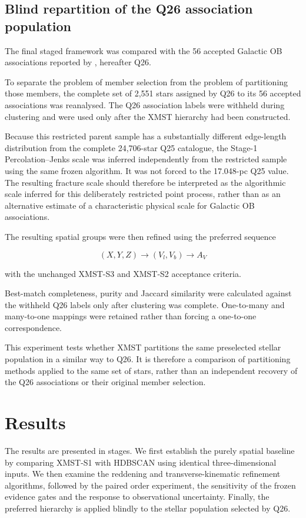 \documentclass[fleqn,usenatbib]{rasti}
\begin{document}
\subsection{Blind repartition of the Q26 association population}
\label{sec:q26_method}

The final staged framework was compared with the 56 accepted Galactic OB
associations reported by \citet{Quintana2026}, hereafter Q26.

To separate the problem of member selection from the problem of partitioning
those members, the complete set of 2,551 stars assigned by Q26 to its
56 accepted associations was reanalysed. The Q26 association labels were
withheld during clustering and were used only after the XMST hierarchy had
been constructed.

Because this restricted parent sample has a substantially different
edge-length distribution from the complete 24,706-star Q25 catalogue, the
Stage-1 Percolation--Jenks scale was inferred independently from the
restricted sample using the same frozen algorithm. It was not forced to the
17.048-pc Q25 value. The resulting fracture scale should therefore be interpreted as the
algorithmic scale inferred for this deliberately restricted point process,
rather than as an alternative estimate of a characteristic physical scale
for Galactic OB associations.

The resulting spatial groups were then refined using the preferred sequence

\[
(X,Y,Z)\rightarrow(V_l,V_b)\rightarrow A_V
\]

with the unchanged XMST-S3 and XMST-S2 acceptance criteria.

Best-match completeness, purity and Jaccard similarity were calculated
against the withheld Q26 labels only after clustering was complete.
One-to-many and many-to-one mappings were retained rather than forcing a
one-to-one correspondence.

This experiment tests whether XMST partitions the same preselected stellar
population in a similar way to Q26. It is therefore a comparison of
partitioning methods applied to the same set of stars, rather than an
independent recovery of the Q26 associations or their original member
selection.



\section{Results}

The results are presented in stages. We first establish the purely spatial
baseline by comparing XMST-S1 with HDBSCAN using identical three-dimensional
inputs. We then examine the reddening and transverse-kinematic refinement
algorithms, followed by the paired order experiment, the sensitivity of the
frozen evidence gates and the response to observational uncertainty. Finally,
the preferred hierarchy is applied blindly to the stellar population selected
by Q26.
\end{document}
